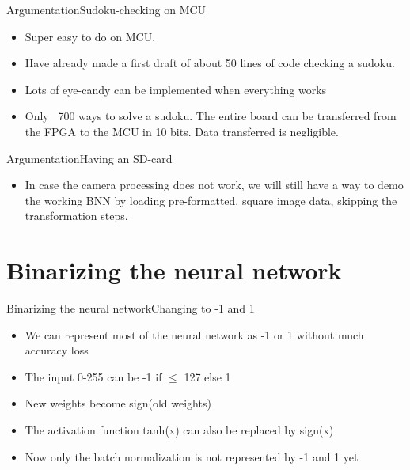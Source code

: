 \documentclass[10pt]{beamer}
\begin{document}
\begin{frame}{Argumentation}{Sudoku-checking on MCU}
\begin{itemize}
\item Super easy to do on MCU.
\item Have already made a first draft of about 50 lines of code checking a sudoku.
\item Lots of eye-candy can be implemented when everything works
\item Only ~700 ways to solve a sudoku. The entire board can be transferred from the FPGA to the MCU in 10 bits. Data transferred is negligible.
\end{itemize}
\end{frame}

\begin{frame}{Argumentation}{Having an SD-card}
\begin{itemize}
\item In case the camera processing does not work, we will still have a way to demo the working BNN by loading pre-formatted, square image data, skipping the transformation steps.
\end{itemize}
\end{frame}


\section{Binarizing the neural network}
\begin{frame}{Binarizing the neural network}{Changing to -1 and 1}
\begin{itemize}
	\item We can represent most of the neural network as -1 or 1 without much accuracy loss
	\item The input 0-255 can be -1 if $\leq$ 127 else 1
	\item New weights become sign(old weights)
	\item The activation function tanh(x) can also be replaced by sign(x)
	\item Now only the batch normalization is not represented by -1 and 1 yet
\end{itemize}
\end{frame}
\end{document}
